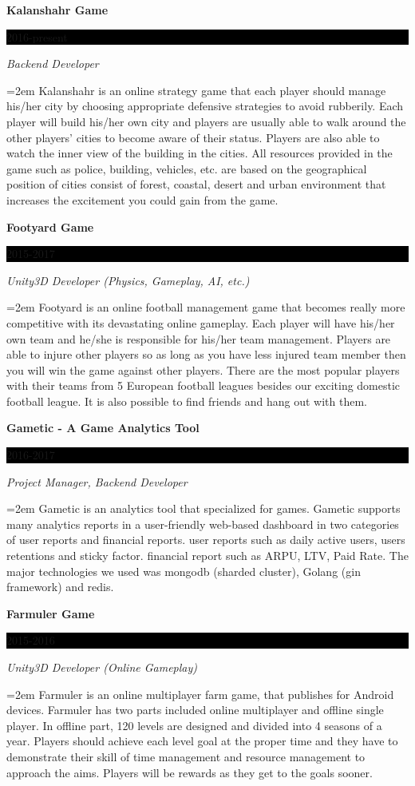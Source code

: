 \documentclass[paper=a4,fontsize=11pt]{scrartcl} %
\newcommand{\sepspace}{\vspace*{1em}}		%
\newcommand{\EducationEntry}[4]{
		\noindent \textbf{#1} \hfill      %
		\colorbox{Black}{%
			\parbox{6em}{%
			\hfill\color{White}#2}} \par  %
		\noindent \textit{#3} \par        %
		\noindent\hangindent=2em\hangafter=0 \small #4 %
		\normalsize \par}
\newcommand{\ExperienceEntry}[4]{ 		%
		\noindent \textbf{#1} \hfill      %
		\colorbox{Black}{%
			\parbox{6em}{%
			\hfill\color{White}#2}} \par  	%
		\noindent \textit{#3} \par        %
		\noindent\hangindent=2em\hangafter=0 \small #4 %
		\normalsize \par}
\begin{document}
\ExperienceEntry{Kalanshahr Game}{2016-present}{Backend Developer}{Kalanshahr is an online strategy game that each player should manage his/her city by choosing appropriate defensive strategies to avoid rubberily. Each player will build his/her own city and players are usually able to walk around the other players' cities to become aware of their status. Players are also able to watch the inner view of the building in the cities. All resources provided in the game such as police, building, vehicles, etc. are based on the geographical position of cities consist of forest, coastal, desert and urban environment that increases the excitement you could gain from the game.}
\sepspace


\ExperienceEntry{Footyard Game}{2015-2017}{Unity3D Developer (Physics, Gameplay, AI, etc.)}{Footyard is an online football management game that becomes really more competitive with its devastating online gameplay. Each player will have his/her own team and he/she is responsible for his/her team management. Players are able to injure other players so as long as you have less injured team member then you will win the game against other players. There are the most popular players with their teams from 5 European football leagues besides our exciting domestic football league. It is also possible to find friends and hang out with them.}
\sepspace

\ExperienceEntry{Gametic - A Game Analytics Tool}{2016-2017}{Project Manager, Backend Developer}{Gametic is an analytics tool that specialized for games. Gametic supports many analytics reports in a user-friendly web-based dashboard in two categories of user reports and financial reports. user reports such as daily active users, users retentions and sticky factor. financial report such as ARPU, LTV, Paid Rate.
The major technologies we used was mongodb (sharded cluster), Golang (gin framework) and redis.}
\sepspace

\ExperienceEntry{Farmuler Game}{2015-2016}{Unity3D Developer (Online Gameplay)}{Farmuler is an online multiplayer farm game, that publishes for Android devices. Farmuler has two parts included online multiplayer and offline single player. In offline part, 120 levels are designed and divided into 4 seasons of a year. Players should achieve each level goal at the proper time and they have to demonstrate their skill of time management and resource management to approach the aims. Players will be rewards as they get to the goals sooner.}
\sepspace
\end{document}
